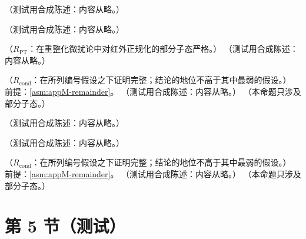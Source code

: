\begin{definition}\label{def:appM-blocks}
（测试用合成陈述：内容从略。）
\end{definition}

\begin{lemma}[条件 (NE) 的适用范围]\label{lem:appM-ne}
（测试用合成陈述：内容从略。）
\end{lemma}

\begin{lemma}\label{lem:appM-uniqueness}
（$R_{\mathrm{PT}}$：在重整化微扰论中对红外正规化的部分子态严格。）
（测试用合成陈述：内容从略。）
\end{lemma}

\begin{theorem}\label{thm:appM-scaling}
（$R_{\mathrm{cond}}$：在所列编号假设之下证明完整；结论的地位不高于其中最弱的假设。）
前提：\cref{asm:appM-remainder}。
（测试用合成陈述：内容从略。）
（本命题只涉及部分子态。）
\end{theorem}

\begin{example}\label{ex:appM-unreduced}
（测试用合成陈述：内容从略。）
\end{example}

\begin{lemma}[动量空间余项到坐标空间余项]\label{lem:appM-symbol}
（测试用合成陈述：内容从略。）
\end{lemma}

\begin{corollary}\label{cor:appM-coordinate}
（$R_{\mathrm{cond}}$：在所列编号假设之下证明完整；结论的地位不高于其中最弱的假设。）
前提：\cref{asm:appM-remainder}。
（测试用合成陈述：内容从略。）
（本命题只涉及部分子态。）
\end{corollary}

\section{第 5 节（测试）}\label{sec:appM-massless}

